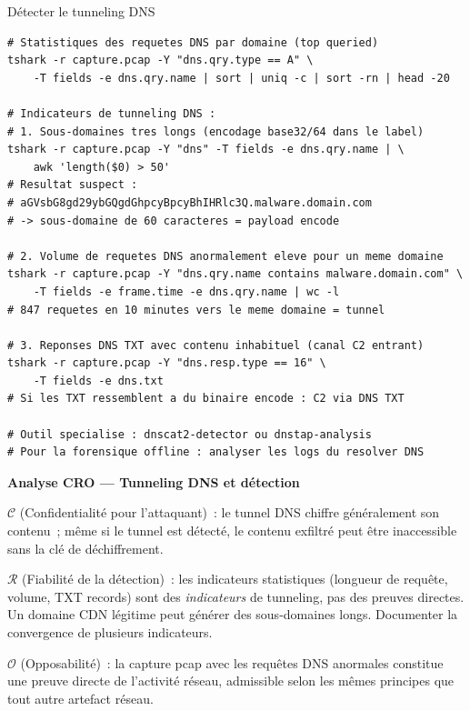 \begin{boxoutils}{Détecter le tunneling DNS}
\begin{lstlisting}[language=bash_forensique]
# Statistiques des requetes DNS par domaine (top queried)
tshark -r capture.pcap -Y "dns.qry.type == A" \
    -T fields -e dns.qry.name | sort | uniq -c | sort -rn | head -20

# Indicateurs de tunneling DNS :
# 1. Sous-domaines tres longs (encodage base32/64 dans le label)
tshark -r capture.pcap -Y "dns" -T fields -e dns.qry.name | \
    awk 'length($0) > 50'
# Resultat suspect :
# aGVsbG8gd29ybGQgdGhpcyBpcyBhIHRlc3Q.malware.domain.com
# -> sous-domaine de 60 caracteres = payload encode

# 2. Volume de requetes DNS anormalement eleve pour un meme domaine
tshark -r capture.pcap -Y "dns.qry.name contains malware.domain.com" \
    -T fields -e frame.time -e dns.qry.name | wc -l
# 847 requetes en 10 minutes vers le meme domaine = tunnel

# 3. Reponses DNS TXT avec contenu inhabituel (canal C2 entrant)
tshark -r capture.pcap -Y "dns.resp.type == 16" \
    -T fields -e dns.txt
# Si les TXT ressemblent a du binaire encode : C2 via DNS TXT

# Outil specialise : dnscat2-detector ou dnstap-analysis
# Pour la forensique offline : analyser les logs du resolver DNS
\end{lstlisting}
\end{boxoutils}

\begin{boxCRO}
\textbf{Analyse CRO --- Tunneling DNS et détection}

$\mathcal{C}$ (Confidentialité pour l'attaquant)~: le tunnel DNS chiffre
généralement son contenu~; même si le tunnel est détecté, le contenu
exfiltré peut être inaccessible sans la clé de déchiffrement.

$\mathcal{R}$ (Fiabilité de la détection)~: les indicateurs
statistiques (longueur de requête, volume, TXT records) sont des
\emph{indicateurs} de tunneling, pas des preuves directes. Un domaine
CDN légitime peut générer des sous-domaines longs. Documenter la
convergence de plusieurs indicateurs.

$\mathcal{O}$ (Opposabilité)~: la capture pcap avec les requêtes DNS
anormales constitue une preuve directe de l'activité réseau, admissible
selon les mêmes principes que tout autre artefact réseau.

\end{boxCRO}

